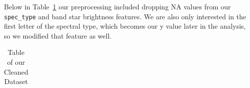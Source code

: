 \documentclass[
  letterpaper,
  DIV=11,
  numbers=noendperiod]{scrartcl}
\begin{document}
Below in Table~\ref{tbl-cleaned-data} our preprocessing included
dropping NA values from our \texttt{spec\_type} and band star brightness
features. We are also only interested in the first letter of the
spectral type, which becomes our y value later in the analysis, so we
modified that feature as well.

\begin{longtable}[]{@{}
  >{\raggedright\arraybackslash}p{}
  >{\raggedright\arraybackslash}p{}
  >{\raggedleft\arraybackslash}p{}
  >{\raggedleft\arraybackslash}p{}
  >{\raggedleft\arraybackslash}p{}
  >{\raggedleft\arraybackslash}p{}
  >{\raggedleft\arraybackslash}p{}@{}}

\caption{\label{tbl-cleaned-data}Table of our Cleaned Dataset}

\tabularnewline


\end{longtable}
\end{document}
